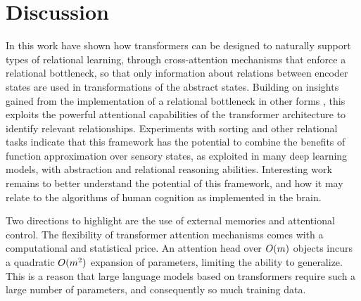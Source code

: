 \section{Discussion}
\label{sec:discuss}



In this work have shown how transformers
can be designed to
%
naturally support types of relational learning, through cross-attention
mechanisms that enforce a relational bottleneck, so that only information about relations between encoder states
are used in transformations of the abstract states.
Building on insights gained from the implementation of a relational bottleneck in other forms \citep{esbn, kerg2022neural}, this exploits the powerful attentional capabilities of the transformer architecture to identify relevant relationships.
Experiments with sorting and other relational tasks indicate that this framework has the potential to combine the benefits of function approximation over sensory states, as exploited in many deep learning models, with abstraction and relational reasoning abilities. Interesting
work remains to better understand the potential of this framework, and
how it may relate to the algorithms of human cognition as implemented in the brain.

Two directions to highlight are the use of external memories and attentional control. The flexibility of transformer attention mechanisms comes with a computational and statistical price. An attention head over 
$O(m)$ objects incurs a quadratic $O(m^2)$ expansion of parameters, limiting the ability to generalize. This is a reason that large language models based on transformers require such a large number of parameters, and consequently so much training data. 

